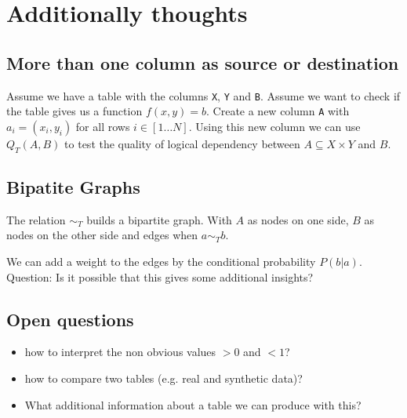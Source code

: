 \documentclass[a4paper]{article}
\begin{document}
\newpage




\newpage
\section{Additionally thoughts}
\subsection{More than one column as source or destination}
Assume we have a table with the columns \texttt{X}, \texttt{Y} and \texttt{B}.
Assume we want to check if the table gives us a function $f(x,y) = b$.
  Create a new column \texttt{A} with $a_i = (x_i, y_i)$ for all rows $i \in [1 \ldots N]$. 
  Using this new column we can use $Q_T(A,B)$ to test the quality of logical dependency between $A \subseteq X \times Y$ and $B$. 

\subsection{Bipatite Graphs}
The relation $\sim_T$ builds a bipartite graph.
With $A$ as nodes on one side, $B$ as nodes on the other side and edges when $a \sim_T b$.

We can add a weight to the edges by the conditional probability $P(b|a)$.
Question: Is it possible that this gives some additional insights?


\subsection{Open questions}
\begin{itemize}
\item how to interpret the non obvious values $> 0$ and $< 1$?
\item how to compare two tables (e.g. real and synthetic data)?
\item What additional information about a table we can produce with this?
\end{itemize}




\end{document}
